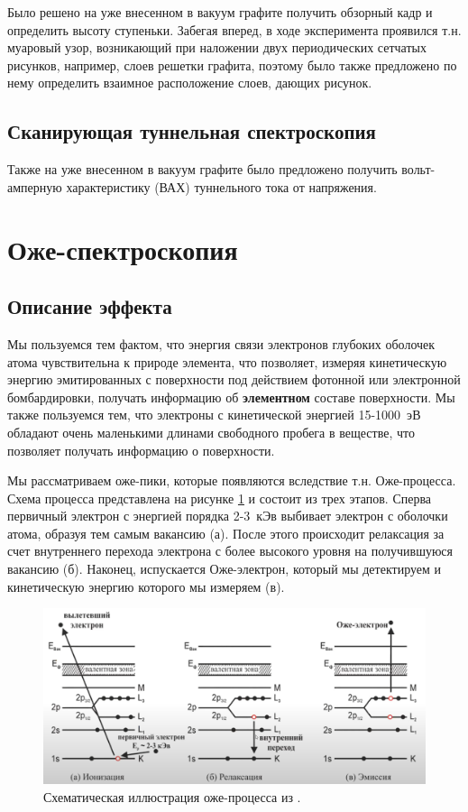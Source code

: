 \documentclass[a4paper, 12pt]{article}
\begin{document}
Было решено на уже внесенном в вакуум графите получить обзорный кадр и определить высоту ступеньки. Забегая вперед, в ходе эксперимента проявился т.н. муаровый узор, возникающий при наложении двух периодических сетчатых рисунков, например, слоев решетки графита, поэтому было также предложено по нему определить взаимное расположение слоев, дающих рисунок.

\subsection{Сканирующая туннельная спектроскопия}

Также на уже внесенном в вакуум графите было предложено получить вольт-амперную характеристику (ВАХ) туннельного тока от напряжения.

\section{Оже-спектроскопия}

\subsection{Описание эффекта}

Мы пользуемся тем фактом, что энергия связи электронов глубоких оболочек атома чувствительна к природе элемента, что позволяет, измеряя кинетическую энергию эмитированных с поверхности под действием фотонной или электронной бомбардировки, получать информацию об \textbf{элементном} составе поверхности. Мы также пользуемся тем, что электроны с кинетической энергией 15-1000~эВ обладают очень маленькими длинами свободного пробега в веществе, что позволяет получать информацию о поверхности.

Мы рассматриваем оже-пики, которые появляются вследствие т.н. Оже-процесса. Схема процесса представлена на рисунке \ref{fig:1_diag} и состоит из трех этапов. Сперва первичный электрон с энергией порядка 2-3~кЭв выбивает электрон с оболочки атома, образуя тем самым вакансию (а). После этого происходит релаксация за счет внутреннего перехода электрона с более высокого уровня на получившуюся вакансию (б). Наконец, испускается Оже-электрон, который мы детектируем и кинетическую энергию которого мы измеряем (в).

\begin{figure}[H]
	\centering
	\includegraphics[width=0.7\linewidth]{1_diag}
	\caption{Схематическая иллюстрация оже-процесса из \cite{Auge_diag}.}
	\label{fig:1_diag}
\end{figure}
\end{document}
